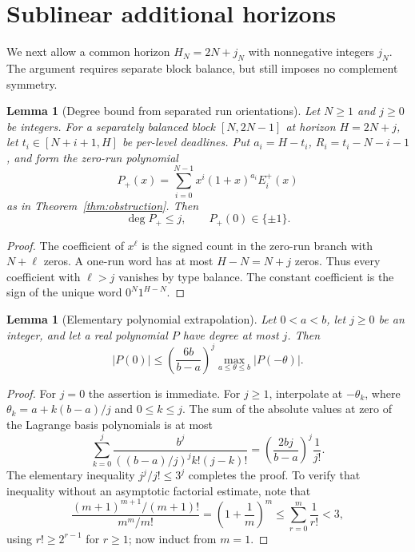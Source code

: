 \documentclass[11pt]{article}
\newtheorem{lemma}[theorem]{Lemma}
\theoremstyle{definition}
\theoremstyle{remark}
\begin{document}
\section{Sublinear additional horizons}\label{sec:extra-horizon}

We next allow a common horizon $H_N=2N+j_N$ with nonnegative integers $j_N$. The argument
requires separate block balance, but still imposes no complement symmetry.

\begin{lemma}[Degree bound from separated run orientations]\label{lem:degree-window}
Let $N\ge1$ and $j\ge0$ be integers. For a separately balanced block
$[N,2N-1]$ at horizon $H=2N+j$, let
$t_i\in[N+i+1,H]$ be per-level deadlines. Put
$a_i=H-t_i$, $R_i=t_i-N-i-1$, and form the zero-run polynomial
\[
 P_+(x)=\sum_{i=0}^{N-1}x^i(1+x)^{a_i}E_i^+(x)
\]
as in Theorem~\ref{thm:obstruction}. Then
\[
 \deg P_+\le j,\qquad P_+(0)\in\{\pm1\}.
\]
\end{lemma}
\begin{proof}
The coefficient of $x^\ell$ is the signed count in the zero-run branch
with $N+\ell$ zeros. A one-run word has at most $H-N=N+j$ zeros.
Thus every coefficient with $\ell>j$ vanishes by type balance.
The constant coefficient is the sign of the unique word
$0^N1^{H-N}$.
\end{proof}

\begin{lemma}[Elementary polynomial extrapolation]\label{lem:extrapolation}
Let $0<a<b$, let $j\ge0$ be an integer, and let a real polynomial $P$
have degree at most $j$.
Then
\begin{equation}\label{eq:extrapolation}
 |P(0)|\le\left(\frac{6b}{b-a}\right)^j
          \max_{a\le\theta\le b}|P(-\theta)|.
\end{equation}
\end{lemma}
\begin{proof}
For $j=0$ the assertion is immediate. For $j\ge1$, interpolate at
$-\theta_k$, where $\theta_k=a+k(b-a)/j$ and $0\le k\le j$.
The sum of the absolute values at zero of the Lagrange basis polynomials
is at most
\[
 \sum_{k=0}^j\frac{b^j}{((b-a)/j)^j k!(j-k)!}
 =\left(\frac{2bj}{b-a}\right)^j\frac1{j!}.
\]
The elementary inequality $j^j/j!\le3^j$ completes the proof. To verify
that inequality without an asymptotic factorial estimate, note that
\[
 \frac{(m+1)^{m+1}/(m+1)!}{m^m/m!}
 =\left(1+\frac1m\right)^m
 \le\sum_{r=0}^m\frac1{r!}<3,
\]
using $r!\ge2^{r-1}$ for $r\ge1$; now induct from $m=1$.
\end{proof}
\end{document}
